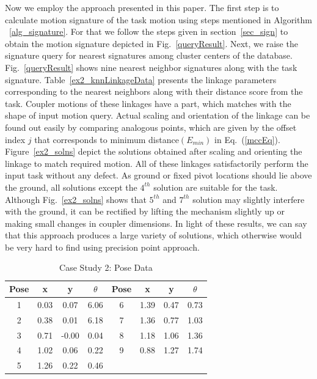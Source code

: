 \documentclass[twocolumn,10pt]{asme2ej}
\newcommand{\req}[1]{(\ref{#1})}
\begin{document}
Now we employ the approach presented in this paper.
The first step is to calculate motion signature of the task motion using steps mentioned in Algorithm ~\ref{alg_signature}.
For that we follow the steps given in section~\ref{sec_sign} to obtain the motion signature depicted in Fig.~\ref{queryResult}.
Next, we raise the signature query for nearest signatures among cluster centers of the database.
Fig.~\ref{queryResult} shows nine nearest neighbor signatures along with the task signature.
Table~\ref{ex2_knnLinkageData} presents the linkage parameters corresponding to the nearest neighbors along with their distance score from the task.
Coupler motions of these linkages have a part, which matches with the shape of input motion query.
Actual scaling and orientation of the linkage can be found out easily by comparing analogous points, which are given by the offset index $j$ that corresponds to minimum distance$(E_{min})$ in Eq.~\req{mccEq}.
Figure~\ref{ex2_solns} depict the solutions obtained after scaling and orienting the linkage to match required motion.
All of these linkages satisfactorily perform the input task without any defect.
As ground or fixed pivot locations should lie above the ground, all solutions except the $4^{th}$ solution are suitable for the task.
Although Fig.~\ref{ex2_solns} shows that $5^{th}$ and $7^{th}$ solution may slightly interfere with the ground, it can be rectified by lifting the mechanism slightly up or making small changes in coupler dimensions.
In light of these results, we can say that this approach produces a large variety of solutions, which otherwise would be very hard to find using precision point approach.


\begin{table}
\caption{Case Study 2: Pose Data}
\centering
\label{poseData}
\begin{tabular}{cccccccc}
\hline
Pose & x & y & $\theta$ & Pose & x & y & $\theta$ \\
\hline
1 & 0.03 & 0.07 & 6.06 & 6 & 1.39 & 0.47 & 0.73 \\
2 & 0.38 & 0.01 & 6.18 & 7 & 1.36 & 0.77 & 1.03 \\
3 & 0.71 &-0.00 & 0.04 & 8 & 1.18 & 1.06 & 1.36 \\
4 & 1.02 & 0.06 & 0.22 & 9 & 0.88 & 1.27 & 1.74 \\
5 & 1.26 & 0.22 & 0.46 & \\
\end{tabular}
\end{table}
\end{document}
